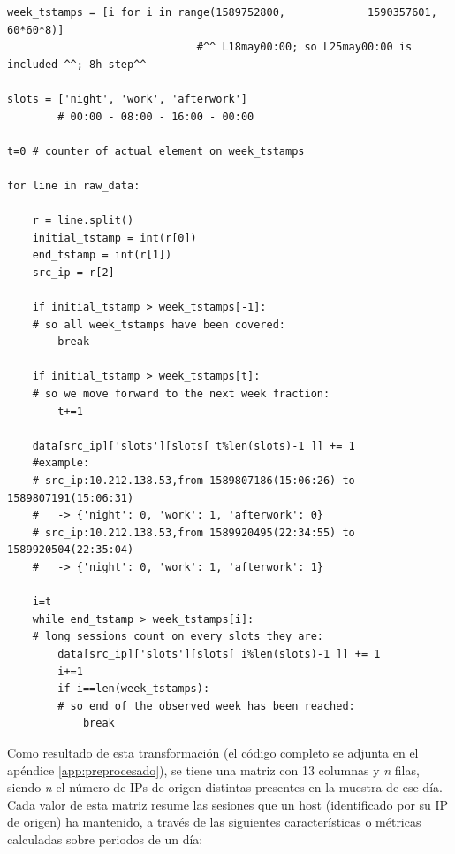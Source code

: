 \begin{verbatim}
week_tstamps = [i for i in range(1589752800,             1590357601, 60*60*8)]
                              #^^ L18may00:00; so L25may00:00 is included ^^; 8h step^^

slots = ['night', 'work', 'afterwork']
        # 00:00 - 08:00 - 16:00 - 00:00

t=0 # counter of actual element on week_tstamps

for line in raw_data:

    r = line.split()
    initial_tstamp = int(r[0])
    end_tstamp = int(r[1])
    src_ip = r[2]

    if initial_tstamp > week_tstamps[-1]:
    # so all week_tstamps have been covered:
        break

    if initial_tstamp > week_tstamps[t]:
    # so we move forward to the next week fraction:
        t+=1

    data[src_ip]['slots'][slots[ t%len(slots)-1 ]] += 1
    #example:
    # src_ip:10.212.138.53,from 1589807186(15:06:26) to 1589807191(15:06:31)
    #   -> {'night': 0, 'work': 1, 'afterwork': 0}
    # src_ip:10.212.138.53,from 1589920495(22:34:55) to 1589920504(22:35:04)
    #   -> {'night': 0, 'work': 1, 'afterwork': 1}

    i=t
    while end_tstamp > week_tstamps[i]:
    # long sessions count on every slots they are:
        data[src_ip]['slots'][slots[ i%len(slots)-1 ]] += 1
        i+=1
        if i==len(week_tstamps):
        # so end of the observed week has been reached:
            break
\end{verbatim}

Como resultado de esta transformación (el código completo se adjunta en el apéndice \ref{app:preprocesado}), se tiene una matriz con 13 columnas y \emph{n} filas, siendo \emph{n} el número de IPs de origen distintas presentes en la muestra de ese día.
Cada valor de esta matriz resume las sesiones que un host (identificado por su IP de origen) ha mantenido, a través de las siguientes características o métricas calculadas sobre periodos de un día:

